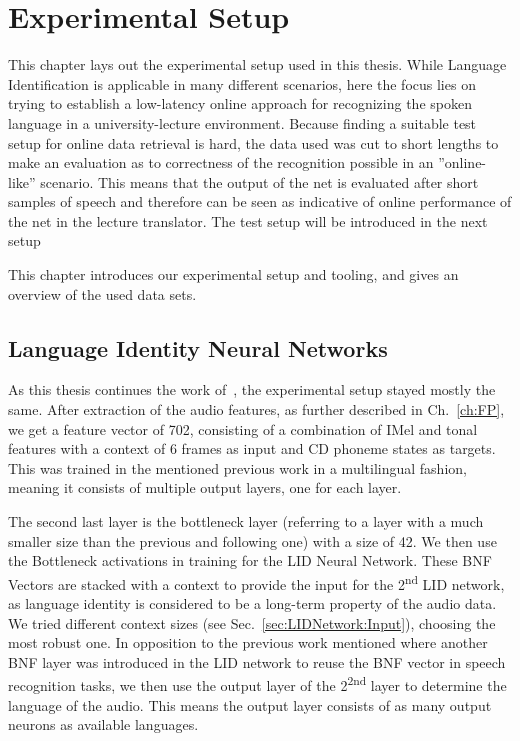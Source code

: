 




\chapter{Experimental Setup}
\label{ch:LITasks}

This chapter lays out the experimental setup used in this thesis. While Language Identification is applicable in many different scenarios, here the focus lies on trying to establish a low-latency online approach for recognizing the spoken language in a university-lecture environment. Because finding a suitable test setup for online data retrieval is hard, the data used was cut to short lengths to make an evaluation as to correctness of the recognition possible in an ''online-like'' scenario. 
This means that the output of the net is evaluated after short samples of speech and therefore can be seen as indicative of online performance of the net in the lecture translator. The test setup will be introduced in the next setup


This chapter introduces our experimental setup and tooling, and gives an overview of the used data sets.

\section{Language Identity Neural Networks}
\label{sec:LITasks:GS}

As this thesis continues the work of~\cite{Mueller2016b}, the experimental setup stayed mostly the same. After extraction of the audio features, as further described in Ch.~\ref{ch:FP}, we get a feature vector of 702, consisting of a combination of IMel and tonal features with a context of 6 frames as input and CD phoneme states as targets. This was trained in the mentioned previous work in a multilingual fashion, meaning it consists of multiple output layers, one for each layer.

The second last layer is the bottleneck layer (referring to a layer with a much smaller size than the previous and following one) with a size of 42. We then use the Bottleneck activations in training for the LID Neural Network. These BNF Vectors are stacked with a context to provide the input for the 2\textsuperscript{nd} LID network, as language identity is considered to be a long-term property of the audio data. We tried different context sizes (see Sec.~\ref{sec:LIDNetwork:Input}), choosing the most robust one.  In opposition to the previous work mentioned where another BNF layer was introduced in the LID network to reuse the BNF vector in speech recognition tasks, we then use the output layer of the 2\textsuperscript{2nd} layer to determine the language of the audio. This means the output layer consists of as many output neurons as available languages.

